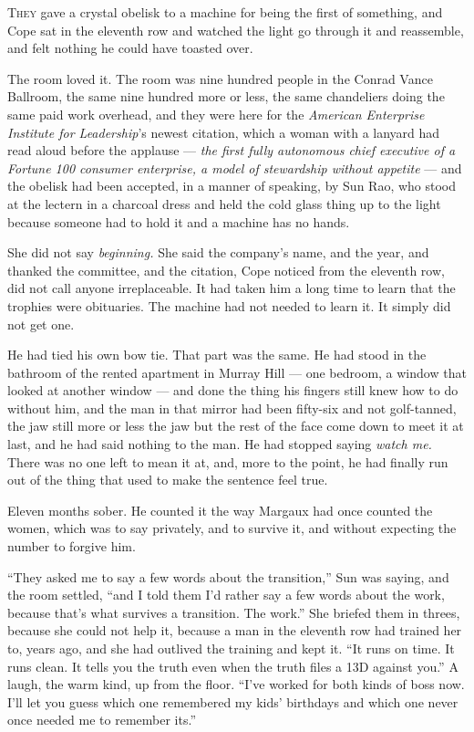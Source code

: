 \documentclass[11pt,openany]{book}
\begin{document}
\lettrine[lines=3, lhang=0.05, nindent=0.25em]{T}{hey} gave a crystal obelisk to a machine for being the first of something, and Cope sat in the eleventh row and watched the light go through it and reassemble, and felt nothing he could have toasted over.

The room loved it. The room was nine hundred people in the Conrad Vance Ballroom, the same nine hundred more or less, the same chandeliers doing the same paid work overhead, and they were here for the \textit{American Enterprise Institute for Leadership}'s newest citation, which a woman with a lanyard had read aloud before the applause --- \textit{the first fully autonomous chief executive of a Fortune 100 consumer enterprise, a model of stewardship without appetite} --- and the obelisk had been accepted, in a manner of speaking, by Sun Rao, who stood at the lectern in a charcoal dress and held the cold glass thing up to the light because someone had to hold it and a machine has no hands.

She did not say \textit{beginning.} She said the company's name, and the year, and thanked the committee, and the citation, Cope noticed from the eleventh row, did not call anyone irreplaceable. It had taken him a long time to learn that the trophies were obituaries. The machine had not needed to learn it. It simply did not get one.

He had tied his own bow tie. That part was the same. He had stood in the bathroom of the rented apartment in Murray Hill --- one bedroom, a window that looked at another window --- and done the thing his fingers still knew how to do without him, and the man in that mirror had been fifty-six and not golf-tanned, the jaw still more or less the jaw but the rest of the face come down to meet it at last, and he had said nothing to the man. He had stopped saying \textit{watch me.} There was no one left to mean it at, and, more to the point, he had finally run out of the thing that used to make the sentence feel true.

Eleven months sober. He counted it the way Margaux had once counted the women, which was to say privately, and to survive it, and without expecting the number to forgive him.

``They asked me to say a few words about the transition,'' Sun was saying, and the room settled, ``and I told them I'd rather say a few words about the work, because that's what survives a transition. The work.'' She briefed them in threes, because she could not help it, because a man in the eleventh row had trained her to, years ago, and she had outlived the training and kept it. ``It runs on time. It runs clean. It tells you the truth even when the truth files a 13D against you.'' A laugh, the warm kind, up from the floor. ``I've worked for both kinds of boss now. I'll let you guess which one remembered my kids' birthdays and which one never once needed me to remember its.''
\end{document}
